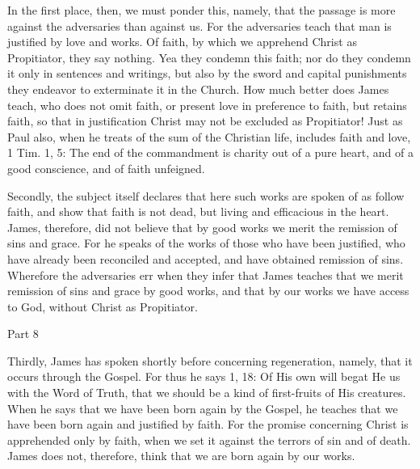 In the first place, then, we must ponder this, namely, that the
passage is more against the adversaries than against us.  For the
adversaries teach that man is justified by love and works.  Of faith,
by which we apprehend Christ as Propitiator, they say nothing.  Yea
they condemn this faith; nor do they condemn it only in sentences and
writings, but also by the sword and capital punishments they endeavor
to exterminate it in the Church.  How much better does James teach,
who does not omit faith, or present love in preference to faith, but
retains faith, so that in justification Christ may not be excluded as
Propitiator!  Just as Paul also, when he treats of the sum of the
Christian life, includes faith and love, 1 Tim. 1, 5: The end of the
commandment is charity out of a pure heart, and of a good conscience,
and of faith unfeigned.

Secondly, the subject itself declares that here such works are spoken
of as follow faith, and show that faith is not dead, but living and
efficacious in the heart.  James, therefore, did not believe that by
good works we merit the remission of sins and grace.  For he speaks
of the works of those who have been justified, who have already been
reconciled and accepted, and have obtained remission of sins.
Wherefore the adversaries err when they infer that James teaches that
we merit remission of sins and grace by good works, and that by our
works we have access to God, without Christ as Propitiator.




Part 8


Thirdly, James has spoken shortly before concerning regeneration,
namely, that it occurs through the Gospel.  For thus he says 1, 18:
Of His own will begat He us with the Word of Truth, that we should be
a kind of first-fruits of His creatures.  When he says that we have
been born again by the Gospel, he teaches that we have been born
again and justified by faith.  For the promise concerning Christ is
apprehended only by faith, when we set it against the terrors of sin
and of death.  James does not, therefore, think that we are born
again by our works.

